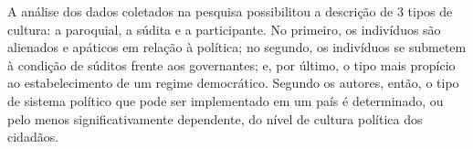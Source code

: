 A análise dos dados coletados na pesquisa possibilitou a descrição de 3 tipos de cultura: a paroquial, a súdita e a participante. No primeiro, os indivíduos são alienados e apáticos em relação à política; no segundo, os indivíduos se submetem à condição de súditos frente aos governantes; e, por último, o tipo mais propício ao estabelecimento de um regime democrático. Segundo os autores, então, o tipo de sistema político que pode ser implementado em um país é determinado, ou pelo menos significativamente dependente, do nível de cultura política dos cidadãos.

